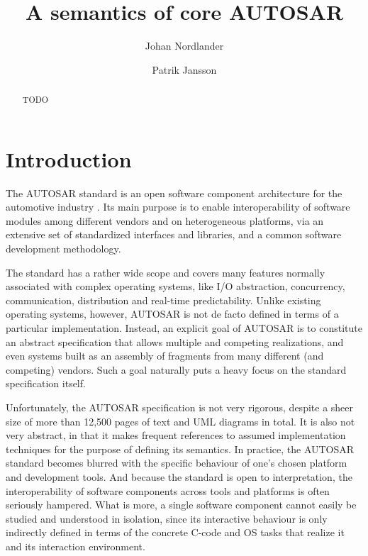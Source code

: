 \documentclass[10pt,conference]{IEEEtran}
\title{A semantics of core AUTOSAR}
\author{Johan Nordlander \and Patrik Jansson}
\begin{document}
\maketitle
\begin{abstract}
TODO

\end{abstract}

\section{Introduction}
\label{sec:Intro}

The AUTOSAR standard is an open software component architecture for the automotive industry \cite{AR:Homepage}. Its main purpose is to enable interoperability of software modules among different vendors and on heterogeneous platforms, via an extensive set of standardized interfaces and libraries, and a common software development methodology.

The standard has a rather wide scope and covers many features normally associated with complex operating systems, like I/O abstraction, concurrency, communication, distribution and real-time predictability. Unlike existing operating systems, however, AUTOSAR is not de facto defined in terms of a particular implementation. Instead, an explicit goal of AUTOSAR is to constitute an abstract specification that allows multiple and competing realizations, and even systems built as an assembly of fragments from many different (and competing) vendors. Such a goal naturally puts a heavy focus on the standard specification itself.

Unfortunately, the AUTOSAR specification is not very rigorous, despite a sheer size of more than 12,500 pages of text and UML diagrams in total. It is also not very abstract, in that it makes frequent references to assumed implementation techniques for the purpose of defining its semantics. In practice, the AUTOSAR standard becomes blurred with the specific behaviour of one's chosen platform and development tools. And because the standard is open to interpretation, the interoperability of software components across tools and platforms is often seriously hampered. What is more, a single software component cannot easily be studied and understood in isolation, since its interactive behaviour is only indirectly defined in terms of the concrete C-code and OS tasks that realize it and its interaction environment.
\end{document}
